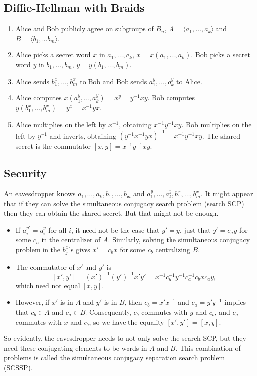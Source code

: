 \documentclass[11pt]{article}
\begin{document}
\subsection*{Diffie-Hellman with Braids \cite{aag99}}
\begin{enumerate}
	\item Alice and Bob publicly agree on subgroups of $B_n$,  $A = \langle a_1, \ldots, a_k\rangle$ and $B = \langle b_1, \ldots b_m\rangle$.
	\item Alice picks a secret word $x$ in $a_1, \ldots, a_k$, $x = x(a_1, \ldots, a_k)$. Bob picks a secret word $y$ in $b_1, \ldots, b_m$, $y = y(b_1, \ldots, b_m)$.
	\item Alice sends $b_1^x, \ldots, b_m^x$ to Bob and Bob sends $a_1^y, \ldots, a_k^y$ to Alice.
	\item Alice computes $x(a_1^y, \ldots, a_k^y) = x^y = y^{-1}xy$. Bob computes $y(b_1^x, \ldots, b_m^x) = y^x = x^{-1}yx$.
	\item Alice multiplies on the left by $x^{-1}$, obtaining $x^{-1}y^{-1}xy$. Bob multiplies on the left by $y^{-1}$ and inverts, obtaining $(y^{-1}x^{-1}yx)^{-1} = x^{-1}y^{-1}xy$. The shared secret is the commutator $[x,y] = x^{-1}y^{-1}xy$.
\end{enumerate}

\subsection*{Security \cite{su06}}
An eavesdropper knows $a_1, \ldots, a_k, b_1, \ldots, b_m$ and $a_1^y, \ldots, a_k^y, b_1^x, \ldots, b_m^x$. It might appear that if they can solve the simultaneous conjugacy search problem (search SCP) then they can obtain the shared secret. But that might not be enough.
\begin{itemize}
	\item If $a_i^{y'} = a_i^y$ for all $i$, it need not be the case that $y' = y$, just that $y' = c_ay$ for some $c_a$ in the centralizer of $A$. Similarly, solving the simultaneous conjugacy problem in the $b_j^x$'s gives $x' = c_bx$ for some $c_b$ centralizing $B$.
	\item The commutator of $x'$ and $y'$ is
	\[
	[x',y'] = (x')^{-1}(y')^{-1}x'y' = x^{-1}c_b^{-1}y^{-1}c_a^{-1}c_bxc_ay,
	\]
	which need not equal $[x,y]$.
	\item However, if $x'$ is in $A$ and $y'$ is in $B$, then $c_b = x'x^{-1}$ and $c_a = y'y^{-1}$ implies that $c_b \in A$ and $c_a\in B$. Consequently, $c_b$ commutes with $y$ and $c_a$, and $c_a$ commutes with $x$ and $c_b$, so we have the equality $[x',y'] = [x,y]$.
\end{itemize}
So evidently, the eavesdropper needs to not only solve the search SCP, but they need these conjugating elements to be words in $A$ and $B$. This combination of problems is called the simultaneous conjugacy separation search problem (SCSSP). 
\end{document}
